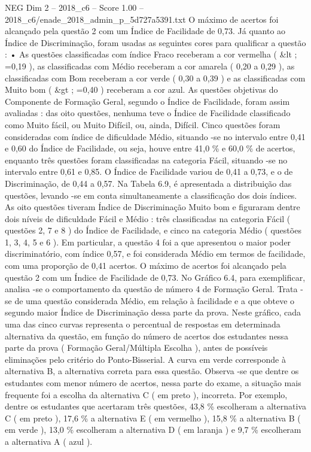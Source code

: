 \begin{textsample}{NEG Dim 2 – 2018\_c6 – Score 1.00 – 2018\_c6/enade\_2018\_admin\_p\_5d727a5391.txt}
O máximo de acertos foi alcançado pela questão 2 com um Índice de Facilidade de 0,73.
Já quanto ao Índice de Discriminação, foram usadas as seguintes cores para qualificar a questão : • As questões classificadas com índice Fraco receberam a cor vermelha ( \&lt ; =0,19 ), as classificadas com Médio receberam a cor amarela ( 0,20 a 0,29 ), as classificadas com Bom receberam a cor verde ( 0,30 a 0,39 ) e as classificadas com Muito bom ( \&gt ; =0,40 ) receberam a cor azul.
As questões objetivas do Componente de Formação Geral, segundo o Índice de Facilidade, foram assim avaliadas : das oito questões, nenhuma teve o Índice de Facilidade classificado como Muito fácil, ou Muito Difícil, ou, ainda, Difícil.
Cinco questões foram consideradas com índice de dificuldade Médio, situando -se no intervalo entre 0,41 e 0,60 do Índice de Facilidade, ou seja, houve entre 41,0 \% e 60,0 \% de acertos, enquanto três questões foram classificadas na categoria Fácil, situando -se no intervalo entre 0,61 e 0,85.
O Índice de Facilidade variou de 0,41 a 0,73, e o de Discriminação, de 0,44 a 0,57.
Na Tabela 6.9, é apresentada a distribuição das questões, levando -se em conta simultaneamente a classificação dos dois índices.
As oito questões tiveram Índice de Discriminação Muito bom e figuraram dentre dois níveis de dificuldade Fácil e Médio : três classificadas na categoria Fácil ( questões 2, 7 e 8 ) do Índice de Facilidade, e cinco na categoria Médio ( questões 1, 3, 4, 5 e 6 ).
Em particular, a questão 4 foi a que apresentou o maior poder discriminatório, com índice 0,57, e foi considerada Médio em termos de facilidade, com uma proporção de 0,41 acertos.
O máximo de acertos foi alcançado pela questão 2 com um Índice de Facilidade de 0,73.
No Gráfico 6.4, para exemplificar, analisa -se o comportamento da questão de número 4 de Formação Geral.
Trata -se de uma questão considerada Médio, em relação à facilidade e a que obteve o segundo maior Índice de Discriminação dessa parte da prova.
Neste gráfico, cada uma das cinco curvas representa o percentual de respostas em determinada alternativa da questão, em função do número de acertos dos estudantes nessa parte da prova ( Formação Geral/Múltipla Escolha ), antes de possíveis eliminações pelo critério do Ponto-Bisserial.
A curva em verde corresponde à alternativa B, a alternativa correta para essa questão.
Observa -se que dentre os estudantes com menor número de acertos, nessa parte do exame, a situação mais frequente foi a escolha da alternativa C ( em preto ), incorreta.
Por exemplo, dentre os estudantes que acertaram três questões, 43,8 \% escolheram a alternativa C ( em preto ), 17,6 \% a alternativa E ( em vermelho ), 15,8 \% a alternativa B ( em verde ), 13,0 \% escolheram a alternativa D ( em laranja ) e 9,7 \% escolheram a alternativa A ( azul ).

\end{textsample}
